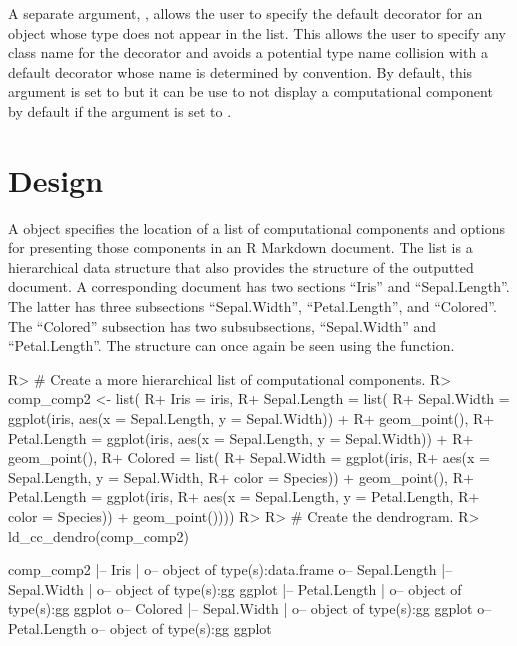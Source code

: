 \documentclass[
]{jss}
\begin{document}
A separate argument, , allows the user to
specify the default decorator for an object whose type does not appear
in the  list. This allows the user to specify any class
name for the decorator and avoids a potential type name collision with a
default decorator whose name is determined by convention. By default,
this argument is set to  but it can be use to not display
a computational component by default if the argument is set to
.

\hypertarget{design}{%
\section{Design}\label{design}}

A  object specifies the location of a list of
computational components and options for presenting those components in
an R Markdown document. The list is a hierarchical data structure that
also provides the structure of the outputted document. A corresponding
document has two sections ``Iris'' and ``Sepal.Length''. The latter has
three subsections ``Sepal.Width'', ``Petal.Length'', and ``Colored''.
The ``Colored'' subsection has two subsubsections, ``Sepal.Width'' and
``Petal.Length''. The structure can once again be seen using the
 function.

\begin{CodeChunk}

\begin{CodeInput}
R> # Create a more hierarchical list of computational components.
R> comp_comp2 <- list(
R+   Iris = iris,
R+   Sepal.Length = list(
R+     Sepal.Width = ggplot(iris, aes(x = Sepal.Length, y = Sepal.Width)) + 
R+       geom_point(),
R+     Petal.Length = ggplot(iris, aes(x = Sepal.Length, y = Sepal.Width)) + 
R+       geom_point(),
R+     Colored = list(
R+       Sepal.Width = ggplot(iris, 
R+                           aes(x = Sepal.Length, y = Sepal.Width, 
R+                               color = Species)) + geom_point(),
R+       Petal.Length = ggplot(iris,
R+                             aes(x = Sepal.Length, y = Petal.Length, 
R+                                 color = Species)) + geom_point())))
R> 
R> # Create the dendrogram.
R> ld_cc_dendro(comp_comp2)
\end{CodeInput}

\begin{CodeOutput}

comp_comp2
  |-- Iris
  |  o-- object of type(s):data.frame
  o-- Sepal.Length
   |-- Sepal.Width
   |  o-- object of type(s):gg ggplot
   |-- Petal.Length
   |  o-- object of type(s):gg ggplot
   o-- Colored
    |-- Sepal.Width
    |  o-- object of type(s):gg ggplot
    o-- Petal.Length
       o-- object of type(s):gg ggplot
\end{CodeOutput}
\end{CodeChunk}
\end{document}
